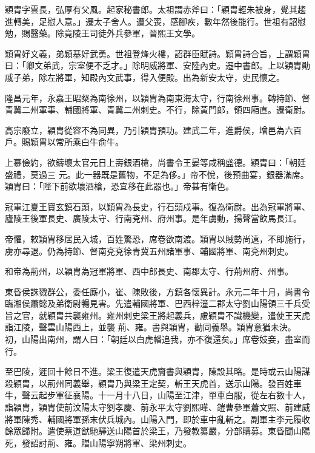 \begin{pinyinscope}
 穎胄字雲長，弘厚有父風。起家秘書郎。太祖謂赤斧曰：「穎胄輕朱被身，覺其趨進轉美，足慰人意。」遷太子舍人。遭父喪，感腳疾，數年然後能行。世祖有詔慰勉，賜醫藥。除竟陵王司徒外兵參軍，晉熙王文學。



 穎胄好文義，弟穎基好武勇。世祖登烽火樓，詔群臣賦詩。穎胄詩合旨，上謂穎胄曰：「卿文弟武，宗室便不乏才。」除明威將軍、安陸內史。遷中書郎。上以穎胄勛戚子弟，除左將軍，知殿內文武事，得入便殿。出為新安太守，吏民懷之。



 隆昌元年，永嘉王昭粲為南徐州，以穎胄為南東海太守，行南徐州事。轉持節、督青冀二州軍事、輔國將軍、青冀二州刺史。不行，除黃門郎，領四廂直。遷衛尉。



 高宗廢立，穎胄從容不為同異，乃引穎胄預功。建武二年，進爵侯，增邑為六百戶。賜穎胄以常所乘白牛俞牛。



 上慕儉約，欲鑄壞太官元日上壽銀酒槍，尚書令王晏等咸稱盛德。穎胄曰：「朝廷盛禮，莫過三
 元。此一器既是舊物，不足為侈。」帝不悅，後預曲宴，銀器滿席。穎胄曰：「陛下前欲壞酒槍，恐宜移在此器也。」帝甚有慚色。



 冠軍江夏王寶玄鎮石頭，以穎胄為長史，行石頭戍事。復為衛尉。出為冠軍將軍、廬陵王後軍長史、廣陵太守、行南兗州、府州事。是年虜動，揚聲當飲馬長江。



 帝懼，敕穎胄移居民入城，百姓驚恐，席卷欲南渡。穎胄以賊勢尚遠，不即施行，虜亦尋退。仍為持節、督南兗兗徐青冀五州諸軍事、輔國將軍、南兗州刺史。



 和帝為荊州，以穎胄為冠軍將軍、西中郎長史、南郡太守、行荊州府、州事。



 東昏侯誅戮群公，委任廝小，崔、陳敗後，方鎮各懷異計。永元二年十月，尚書令臨湘侯蕭懿及弟衛尉暢見害。先遣輔國將軍、巴西梓潼二郡太守劉山陽領三千兵受旨之官，就穎胄共襲雍州。雍州刺史梁王將起義兵，慮穎胄不識機變，遣使王天虎詣江陵，聲雲山陽西上，並襲
 荊、雍。書與穎胄，勸同義舉。穎胄意猶未決。初，山陽出南州，謂人曰：「朝廷以白虎幡追我，亦不復還矣。」席卷妓妾，盡室而行。



 至巴陵，遲回十餘日不進。梁王復遣天虎齎書與穎胄，陳設其略。是時或云山陽謀殺穎胄，以荊州同義舉，穎胄乃與梁王定契，斬王天虎首，送示山陽。發百姓車牛，聲云起步軍征襄陽。十一月十八日，山陽至江津，單車白服，從左右數十人，詣穎胄，穎胄使前汶陽太守劉孝慶、前永平太守劉熙曄、鎧曹參軍蕭文照、前建威將軍陳秀、輔國將軍孫末伏兵城內。山陽入門，即於車中亂斬之。副軍主李元履收餘眾歸附。遣使蔡道猷馳驛送山陽首於梁王，乃發教纂嚴，分部購募。東昏聞山陽死，發詔討荊、雍。贈山陽寧朔將軍、梁州刺史。




\end{pinyinscope}
